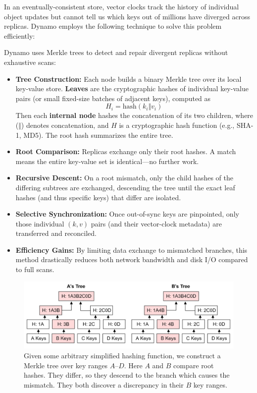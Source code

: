 \newpage
\noindent
In an eventually-consistent store, vector clocks track the history of individual object updates but cannot tell us which keys out of millions have diverged across replicas. Dynamo employs the following technique to solve this problem efficiently:
\begin{Def}

    Dynamo uses Merkle trees to detect and repair divergent replicas without exhaustive scans:
    
    \begin{itemize}
      \item \textbf{Tree Construction:} Each node builds a binary Merkle tree over its local key-value store.  \textbf{Leaves} are the cryptographic hashes of individual key-value pairs (or small fixed-size batches of adjacent keys), computed as 
      \[
        H_i = \text{hash}(k_i \Vert v_i)\,
      \]
      Then each \textbf{internal node} hashes the concatenation of its two children,
      where ($\Vert$) denotes concatenation, and $H$ is a cryptographic hash function (e.g., SHA-1, MD5). The root hash summarizes the entire tree.
      \item \textbf{Root Comparison:} Replicas exchange only their root hashes.  A match means the entire key-value set is identical—no further work.
      \item \textbf{Recursive Descent:} On a root mismatch, only the child hashes of the differing subtrees are exchanged, descending the tree until the exact leaf hashes (and thus specific keys) that differ are isolated.
      \item \textbf{Selective Synchronization:} Once out-of-sync keys are pinpointed, only those individual $(k,v)$ pairs (and their vector-clock metadata) are transferred and reconciled.
      \item \textbf{Efficiency Gains:} By limiting data exchange to mismatched branches, this method drastically reduces both network bandwidth and disk I/O compared to full scans.
    \end{itemize}
    \end{Def}
    
\begin{figure}[h]
            
            \centering
            \includegraphics[width=.95\textwidth]{Sections/dyn/merkle.png}
            \caption{Given some arbitrary simplified hashing function, we construct a Merkle tree over key ranges $A$--$D$. Here $A$ and $B$ compare root hashes. They differ, so they descend to the branch 
            which causes the mismatch. They both discover a discrepancy in their $B$ key ranges.}
            \label{fig:merkle}
\end{figure}


